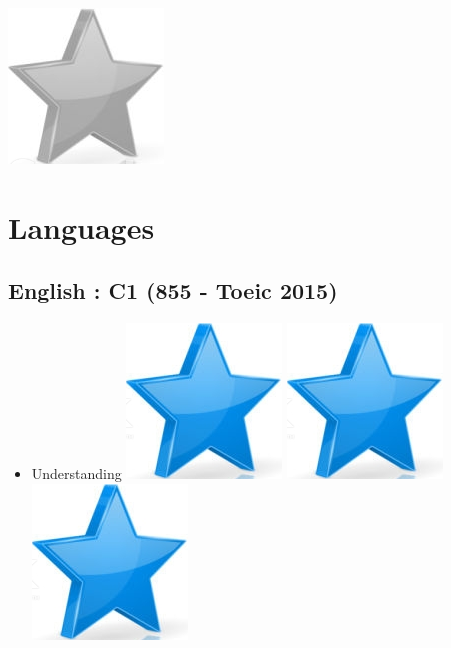 \documentclass[10pt,a4paper,sans]{article}
\begin{document}
\begin{minipage}[t]{0.28\textwidth}
\begin{mdframed}[style=cadreCompetences]
\begin{itemize}
{                    \includegraphics[scale=0.25]{img/empty_star.png}}
            \end{itemize}

        \section{Languages}
        \subsection{English : C1 \newline (855 - Toeic 2015)}
            \begin{itemize}
                \item{Understanding
                    \hfill
                    \includegraphics[scale=0.25]{img/star.png} \hspace{-0.22cm}
                    \includegraphics[scale=0.25]{img/star.png} \hspace{-0.22cm}
                    \includegraphics[scale=0.25]{img/star.png} \hspace{-0.22cm}
}
\end{itemize}
\end{mdframed}
\end{minipage}
\end{document}
